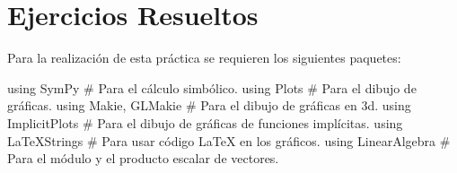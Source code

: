 \documentclass[
  a4paper,
]{scrreport}
\newenvironment{Shaded}{\begin{snugshade}}{\end{snugshade}}
\newcommand{\BuiltInTok}[1]{\textcolor[rgb]{0.00,0.23,0.31}{#1}}
\newcommand{\CommentTok}[1]{\textcolor[rgb]{0.37,0.37,0.37}{#1}}
\newcommand{\ImportTok}[1]{\textcolor[rgb]{0.00,0.46,0.62}{#1}}
\newcommand{\NormalTok}[1]{\textcolor[rgb]{0.00,0.23,0.31}{#1}}
\theoremstyle{definition}
\theoremstyle{remark}
\begin{document}
\hypertarget{ejercicios-resueltos-7}{%
\section{Ejercicios Resueltos}\label{ejercicios-resueltos-7}}

Para la realización de esta práctica se requieren los siguientes
paquetes:

\begin{Shaded}
\begin{Highlighting}[]
\ImportTok{using} \BuiltInTok{SymPy  }\CommentTok{\# Para el cálculo simbólico.}
\ImportTok{using} \BuiltInTok{Plots  }\CommentTok{\# Para el dibujo de gráficas.}
\ImportTok{using} \BuiltInTok{Makie}\NormalTok{, }\BuiltInTok{GLMakie }\CommentTok{\# Para el dibujo de gráficas en 3d.}
\ImportTok{using} \BuiltInTok{ImplicitPlots }\CommentTok{\# Para el dibujo de gráficas de funciones implícitas.}
\ImportTok{using} \BuiltInTok{LaTeXStrings  }\CommentTok{\# Para usar código LaTeX en los gráficos.}
\ImportTok{using} \BuiltInTok{LinearAlgebra }\CommentTok{\# Para el módulo y el producto escalar de vectores.}
\end{Highlighting}
\end{Shaded}
\end{document}
